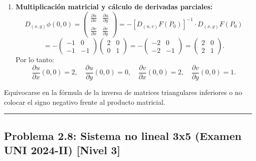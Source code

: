 \documentclass[11pt,a4paper]{article}
\begin{document}
\begin{enumerate}[label=\textbf{\arabic*.}]
\item \textbf{Multiplicación matricial y cálculo de derivadas parciales:}
\begin{equation*}
D_{(x,y)}\phi(0,0) = \begin{pmatrix} \frac{\partial u}{\partial x} & \frac{\partial u}{\partial y} \\ \frac{\partial v}{\partial x} & \frac{\partial v}{\partial y} \end{pmatrix} = - [D_{(u,v)}F(P_0)]^{-1} \cdot D_{(x,y)}F(P_0)
\end{equation*}
\begin{equation*}
= - \begin{pmatrix} -1 & 0 \\ -1 & -1 \end{pmatrix} \begin{pmatrix} 2 & 0 \\ 0 & 1 \end{pmatrix} = - \begin{pmatrix} -2 & 0 \\ -2 & -1 \end{pmatrix} = \begin{pmatrix} 2 & 0 \\ 2 & 1 \end{pmatrix}.
\end{equation*}
Por lo tanto:
\begin{equation*}
\frac{\partial u}{\partial x}(0,0) = 2, \quad \frac{\partial u}{\partial y}(0,0) = 0, \quad \frac{\partial v}{\partial x}(0,0) = 2, \quad \frac{\partial v}{\partial y}(0,0) = 1.
\end{equation*}
\end{enumerate}

\begin{trapbox}
Equivocarse en la fórmula de la inversa de matrices triangulares inferiores o no colocar el signo negativo frente al producto matricial.
\end{trapbox}

\vspace{0.5cm}
\hrule
\vspace{0.5cm}

\subsection*{Problema 2.8: Sistema no lineal 3x5 (Examen UNI 2024-II) \hfill \color{primaryblue}\small[Nivel 3]}
\end{document}
